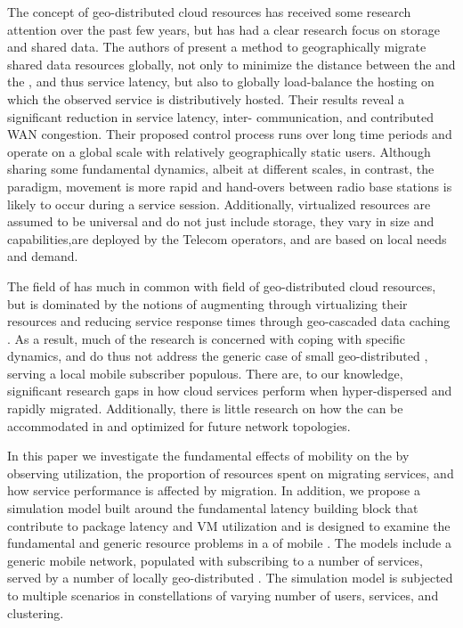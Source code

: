 The concept of geo-distributed cloud resources has received some research attention over the past few years, but has had a clear research focus on storage and shared data. The authors of \cite{agarwal2010volley} present a method to geographically migrate shared data resources globally, not only to minimize the distance between the \ue{} and the \dc{}, and thus service latency, but also to globally load-balance the hosting \dcs{} on which the observed service is distributively hosted. Their results reveal a significant reduction in service latency, inter-\dc{} communication, and contributed WAN congestion. Their proposed control process runs over long time periods and operate on a global scale with relatively geographically static users. Although sharing some fundamental dynamics, albeit at different scales, in contrast, the \xcloud{} paradigm, \ue{} movement is more rapid and hand-overs between radio base stations is likely to occur during a service session. Additionally, \xcloud{} virtualized resources are assumed to be universal and do not just include storage, they vary in size and capabilities,are  deployed by the Telecom operators, and are based on local needs and demand.

The field of \xcloud{} has much in common with field of geo-distributed cloud resources, but is dominated by the notions of augmenting \ues{} through virtualizing their resources \cite{6563280} and reducing service response times through geo-cascaded data caching \cite{1437087,ericsson_akami}. As a result, much of the research is concerned with coping with specific dynamics, and do thus not address the generic case of small geo-distributed \dcs{}, serving a local mobile subscriber populous. There are, to our knowledge, significant research gaps in how cloud services perform when hyper-dispersed and rapidly migrated. Additionally, there is little research on how the \xcloud{} can be accommodated in and optimized for future network topologies.

In this paper we investigate the fundamental effects of \ue{} mobility on the \xcloud{} by observing \dc{} utilization, the proportion of \dcs{} resources spent on migrating services, and how service performance is affected by migration. In addition, we propose a simulation model built around the fundamental latency building block that contribute to package latency and VM utilization and is designed to examine the fundamental and generic resource problems in a \xcloud{} of mobile \ues{}. The models include a generic mobile network, populated with \ues{} subscribing to a number of services, served by a number of locally geo-distributed \dcs{}. The simulation model is subjected to multiple scenarios in constellations of varying number of users, services, and \dc{} clustering.

